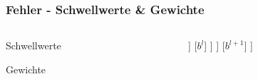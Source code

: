 \begin{frame}
\frametitle{Fehler - Schwellwerte \& Gewichte}

\vspace{-8mm}


\vspace{3mm}

\begin{columns}
\begin{column}{.5\textwidth}

\begin{block}{Schwellwerte}
\end{block}

\begin{block}{Gewichte}
\end{block}

\end{column}


\vrule

\begin{column}{.5\textwidth}

\begin{center}
\begin{forest}
 [$z^{l+1}$
 	[$w^{l+1}$]
 	[$a^{l}$
 		[$z^{l}$
			[$w^l$]
			[$a^{l-1}$
				[\ldots]
			]
			[$b^{l}$]
 		]
 	]
 	[$b^{l+1}$]
 ]
\end{forest}
\end{center}

\end{column}
\end{columns}
\end{frame}

